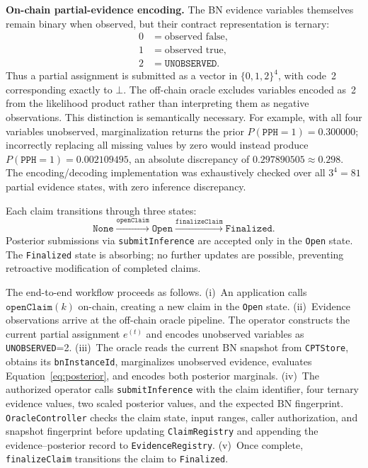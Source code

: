 \documentclass[journal]{IEEEtran}
\theoremstyle{definition}
\theoremstyle{remark}
\begin{document}
\noindent\textbf{On-chain partial-evidence encoding.}
The BN evidence variables themselves remain binary when
observed, but their contract representation is ternary:
\[
\begin{aligned}
0 &= \text{observed false}, \\
1 &= \text{observed true}, \\
2 &= \texttt{UNOBSERVED}.
\end{aligned}
\]
Thus a partial assignment is submitted as a vector in
$\{0,1,2\}^4$, with code~2 corresponding exactly to
$\bot$. The off-chain oracle excludes variables encoded
as~2 from the likelihood product rather than interpreting
them as negative observations. This distinction is
semantically necessary. For example, with all four
variables unobserved, marginalization returns the prior
$P(\texttt{PPH}=1)=0.300000$; incorrectly replacing
all missing values by zero would instead produce
$P(\texttt{PPH}=1)=0.002109495$, an absolute discrepancy
of $0.297890505\approx0.298$.
The encoding/decoding implementation was exhaustively
checked over all $3^4=81$ partial evidence states, with
zero inference discrepancy.

Each claim transitions through three states:
\[
  \texttt{None}
  \xrightarrow{\texttt{openClaim}}
  \texttt{Open}
  \xrightarrow{\texttt{finalizeClaim}}
  \texttt{Finalized}.
\]
Posterior submissions via \texttt{submitInference} are
accepted only in the \texttt{Open} state.
The \texttt{Finalized} state is absorbing; no further
updates are possible, preventing retroactive
modification of completed claims.

The end-to-end workflow proceeds as follows.
(i)~An application calls $\texttt{openClaim}(k)$
on-chain, creating a new claim in the \texttt{Open}
state.
(ii)~Evidence observations arrive at the off-chain oracle
pipeline. The operator constructs the current partial
assignment $e^{(t)}$ and encodes unobserved variables as
\texttt{UNOBSERVED}=2.
(iii)~The oracle reads the current BN snapshot from
\texttt{CPTStore}, obtains its
\texttt{bnInstanceId}, marginalizes unobserved evidence,
evaluates Equation~\eqref{eq:posterior}, and encodes both
posterior marginals.
(iv)~The authorized operator calls
\texttt{submitInference} with the claim identifier, four
ternary evidence values, two scaled posterior values, and
the expected BN fingerprint. \texttt{OracleController}
checks the claim state, input ranges, caller authorization,
and snapshot fingerprint before updating
\texttt{ClaimRegistry} and appending the evidence--posterior
record to \texttt{EvidenceRegistry}.
(v)~Once complete, \texttt{finalizeClaim} transitions
the claim to \texttt{Finalized}.
\end{document}

